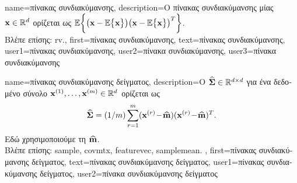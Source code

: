 {name={\foreignlanguage{greek}{πίνακας συνδιακύμανσης}}, 
	description={\foreignlanguage{greek}{Ο} 
		\foreignlanguage{greek}{πίνακας συνδιακύμανσης μίας}  ${\bf x} \in \mathbb{R}^{d}$ 
		\foreignlanguage{greek}{ορίζεται ως} $\mathbb{E} \bigg \{ \big( {\bf x} - \mathbb{E} \big\{ {\bf x} \big\} \big)  \big({\bf x} - \mathbb{E} \big\{ {\bf x} \big\} \big)^{T} \bigg\}$.\\
		\foreignlanguage{greek}{Βλέπε επίσης:} \gls{rv}.},
	first={\foreignlanguage{greek}{πίνακας συνδιακύμανσης}},
	text={\foreignlanguage{greek}{πίνακας συνδιακύμανσης}},
	user1={\foreignlanguage{greek}{πίνακας συνδιακύμανσης}}, %
  	user2={\foreignlanguage{greek}{πίνακα συνδιακύμανσης}}, %
	user3={\foreignlanguage{greek}{πίνακα συνδιακύμανσης}} %
}

{name={\foreignlanguage{greek}{πίνακας συνδιακύμανσης δείγματος}}, 
	description={\foreignlanguage{greek}{Ο} 
		  $\widehat{\bf \Sigma} \in \mathbb{R}^{d \times d}$ 
		\foreignlanguage{greek}{για ένα δεδομένο σύνολο}  
		${\bf x}^{(1)},\ldots,{\bf x}^{(m)} \in \mathbb{R}^{d}$ \foreignlanguage{greek}{ορίζεται ως}  
		$$\widehat{\bf \Sigma} = (1/m) \sum_{r=1}^{m} ({\bf x}^{(r)}\!-\!\widehat{{\bf m}}) ({\bf x}^{(r)}\!-\!\widehat{{\bf m}})^{T}.$$ 
		\foreignlanguage{greek}{Εδώ χρησιμοποιούμε τη}  $\widehat{{\bf m}}$.\\
		\foreignlanguage{greek}{Βλέπε επίσης:} \gls{sample}, \gls{covmtx}, \gls{featurevec}, \gls{samplemean}.
	},
	first={\foreignlanguage{greek}{πίνακας συνδιακύμανσης δείγματος}},
	text={\foreignlanguage{greek}{πίνακας συνδιακύμανσης δείγματος}},
	user1={\foreignlanguage{greek}{πίνακας συνδιακύμανσης δείγματος}}, %
	user2={\foreignlanguage{greek}{πίνακα συνδιακύμανσης δείγματος}} %
}


